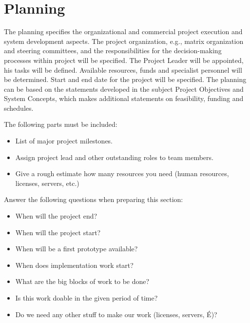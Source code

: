 \documentclass[12pt]{article}
\theoremstyle{definition}
\newenvironment{explanation}{%
   \setlength{\parindent}{0pt}
   \itshape
   \color{blue}
}{}
\begin{document}
\section{Planning}
\begin{explanation}
The planning specifies the organizational and commercial project execution and system development aspects. The project organization, e.g., matrix organization and steering committees, and the responsibilities for the decision-making processes within project will be specified.
The Project Leader will be appointed, his tasks will be defined. Available resources, funds and specialist personnel will be determined. Start and end date for the project will be specified. The planning can be based on the statements developed in the subject Project Objectives and System Concepts, which makes additional statements on feasibility, funding and schedules.

The following parts must be included:
\begin{itemize}
\item List of major project milestones.
\item Assign project lead and other outstanding roles to team members.
\item Give a rough estimate how many resources you need (human resources, licenses, servers, etc.)
\end{itemize}

Answer the following questions when preparing this section:
\begin{itemize}
\item When will the project end?
\item When will the project start?
\item When will be a first prototype available?
\item When does implementation work start?
\item What are the big blocks of work to be done?
\item Is this work doable in the given period of time?
\item Do we need any other stuff to make our work (licenses, servers, É)?
\end{itemize}
\end{explanation}
\end{document}
